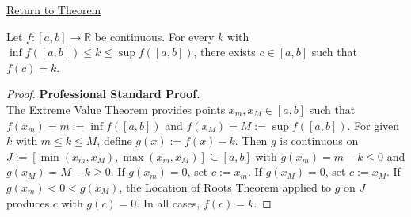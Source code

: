 \newpage
{}
\label{prf:ivt-between-inf-and-sup}

\begin{remark*}[Return]
\hyperref[cor:ivt-between-inf-and-sup]{Return to Theorem}
\end{remark*}

\begin{theorem*}
Let $f : [a,b] \to \mathbb{R}$ be continuous. For every $k$ with $\inf f([a,b]) \leq k \leq \sup f([a,b])$, there exists $c \in [a,b]$ such that $f(c) = k$.
\end{theorem*}

\begin{proof}
\textbf{Professional Standard Proof.}~\\
The Extreme Value Theorem provides points $x_m, x_M \in [a,b]$ such that $f(x_m) = m := \inf f([a,b])$ and $f(x_M) = M := \sup f([a,b])$. For given $k$ with $m \leq k \leq M$, define $g(x) := f(x) - k$. Then $g$ is continuous on $J := [\min(x_m, x_M), \max(x_m, x_M)] \subseteq [a,b]$ with $g(x_m) = m - k \leq 0$ and $g(x_M) = M - k \geq 0$. If $g(x_m) = 0$, set $c := x_m$. If $g(x_M) = 0$, set $c := x_M$. If $g(x_m) < 0 < g(x_M)$, the Location of Roots Theorem applied to $g$ on $J$ produces $c$ with $g(c) = 0$. In all cases, $f(c) = k$.
\end{proof}

